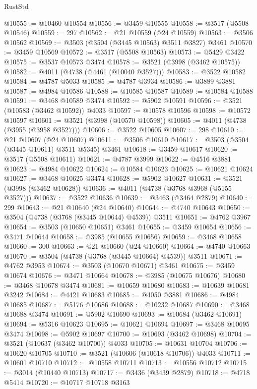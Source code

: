 \begin{lexlean}{RustStd}
\begin{coremodule}
@10555 := @10460 @10554
@10556 := @3459 @10555
@10558 := @3517 (@5508 @10546)
@10559 := 297
@10562 := @21 @10559 (@24 @10559)
@10563 := @3506 @10562
@10569 := @3503 (@3504 (@3445 @10563) @3511 @3827) @3461
@10570 := @3459 @10569
@10572 := @3517 (@5508 @10563)
@10573 := @5429 @3422
@10575 := @3537 @10573 @3474
@10578 := @3521 (@3998 (@3462 @10575))
@10582 := @4011 (@4738 (@4461 (@10040 @3527)))
@10583 := @3522 @10582
@10584 := @4787 @5033
@10585 := @4787 @3934
@10586 := @3889 @3881
@10587 := @4984 @10586
@10588 := @10585 @10587
@10589 := @10584 @10588
@10591 := @3468 @10589 @3474
@10592 := @5902 @10591
@10596 := @3521 (@10583 (@3462 @10592)) @4033
@10597 := @10578 @10596
@10598 := @10572 @10597
@10601 := @3521 (@3998 (@10570 @10598))
@10605 := @4011 (@4738 (@3955 (@3958 @3527)))
@10606 := @3522 @10605
@10607 := 298
@10610 := @21 @10607 (@24 @10607)
@10611 := @3506 @10610
@10617 := @3503 (@3504 (@3445 @10611) @3511 @5345) @3461
@10618 := @3459 @10617
@10620 := @3517 (@5508 @10611)
@10621 := @4787 @3999
@10622 := @4516 @3881
@10623 := @4984 @10622
@10624 := @10584 @10623
@10625 := @10621 @10624
@10627 := @3468 @10625 @3474
@10628 := @5902 @10627
@10631 := @3521 (@3998 (@3462 @10628))
@10636 := @4011 (@4738 (@3768 @3968 (@5155 @3527)))
@10637 := @3522 @10636
@10639 := @3463 (@3464 @2879)
@10640 := 299
@10643 := @21 @10640 (@24 @10640)
@10644 := @4740 @10643
@10650 := @3504 (@4738 (@3768 (@3445 @10644) @4539)) @3511
@10651 := @4762 @3967
@10654 := @3503 (@10650 @10651) @3461
@10655 := @3459 @10654
@10656 := @3471 @10644
@10658 := @3985 (@10655 @10656)
@10659 := @3468 @10658
@10660 := 300
@10663 := @21 @10660 (@24 @10660)
@10664 := @4740 @10663
@10670 := @3504 (@4738 (@3768 (@3445 @10664) @4539)) @3511
@10671 := @4762 @3953
@10674 := @3503 (@10670 @10671) @3461
@10675 := @3459 @10674
@10676 := @3471 @10664
@10678 := @3985 (@10675 @10676)
@10680 := @3468 @10678 @3474
@10681 := @10659 @10680
@10683 := @10639 @10681 @3242
@10684 := @4421 @10683
@10685 := @4050 @3881
@10686 := @4984 @10685
@10687 := @5176 @10686
@10688 := @10232 @10687
@10690 := @3468 @10688 @3474
@10691 := @5902 @10690
@10693 := @10684 (@3462 @10691)
@10694 := @5316 @10623
@10695 := @10621 @10694
@10697 := @3468 @10695 @3474
@10698 := @5902 @10697
@10700 := @10693 (@3462 @10698)
@10704 := @3521 (@10637 (@3462 @10700)) @4033
@10705 := @10631 @10704
@10706 := @10620 @10705
@10710 := @3521 (@10606 (@10618 @10706)) @4033
@10711 := @10601 @10710
@10712 := @10558 @10711
@10713 := @10556 @10712
@10715 := @3014 (@10440 @10713)
@10717 := @3436 (@3439 @2879)
@10718 := @4718 @5414
@10720 := @10717 @10718 @3163

\end{coremodule}
\end{lexlean}

